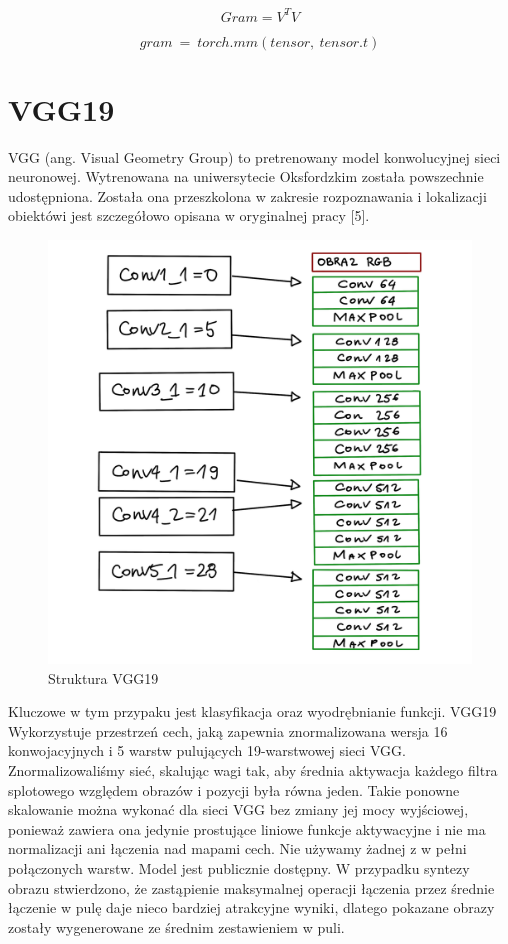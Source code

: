 \documentclass[brudnopis]{xmgr}
\begin{document}
\begin{equation}
Gram = V^TV
\end{equation}


\begin{equation}
gram\:=\:torch.mm (tensor,\:tensor.t)
\end{equation}




\section{VGG19\label{s:dsssl}}

VGG (ang. Visual Geometry Group) to pretrenowany model konwolucyjnej sieci neuronowej. 
Wytrenowana na uniwersytecie Oksfordzkim została powszechnie udostępniona. Została ona  przeszkolona w zakresie rozpoznawania i lokalizacji obiektówi jest szczegółowo opisana w oryginalnej pracy [5].


\begin{figure}[!tbh]
\centering
\includegraphics[width=.8\hsize]{fig/7}
\caption{Struktura VGG19\label{RYS.4}}
\end{figure}


Kluczowe w tym przypaku jest klasyfikacja oraz wyodrębnianie funkcji.
VGG19 Wykorzystuje przestrzeń cech, jaką zapewnia znormalizowana wersja 16 konwojacyjnych i 5 warstw pulujących 19-warstwowej sieci VGG. Znormalizowaliśmy sieć, skalując wagi tak, aby średnia aktywacja każdego filtra splotowego względem obrazów i pozycji była równa jeden. Takie ponowne skalowanie można wykonać dla sieci VGG bez zmiany jej mocy wyjściowej, ponieważ zawiera ona jedynie prostujące liniowe funkcje aktywacyjne i nie ma normalizacji ani łączenia nad mapami cech. Nie używamy żadnej z w pełni połączonych warstw. Model jest publicznie dostępny. W przypadku syntezy obrazu stwierdzono, że zastąpienie maksymalnej operacji łączenia przez średnie łączenie w pulę daje nieco bardziej atrakcyjne wyniki, dlatego pokazane obrazy zostały wygenerowane ze średnim zestawieniem w puli. 
\end{document}
